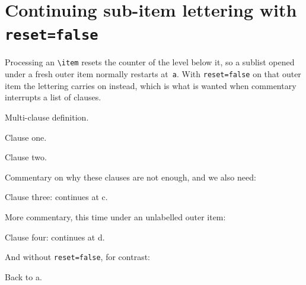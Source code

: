 \documentclass{article}
\begin{document}
\section{Continuing sub-item lettering with \texttt{reset=false}}

Processing an \verb|\item| resets the counter of the level below it, so a sublist
opened under a fresh outer item normally restarts at~\texttt{a}.  With
\texttt{reset=false} on that outer item the lettering carries on instead, which
is what is wanted when commentary interrupts a list of clauses.

\begin{prop}
  \item[style=P] Multi-clause definition. \label{mcd}
  \begin{prop}
    \item Clause one. \label{cl1}
    \item Clause two. \label{cl2}
  \end{prop}
\end{prop}

Commentary on why these clauses are not enough, and we also need:

\begin{prop}
  \item[reset=false]
  \begin{prop}
    \item Clause three: continues at c. \label{cl3}
  \end{prop}
\end{prop}

More commentary, this time under an unlabelled outer item:

\begin{prop}
  \item[counter=none, reset=false]
  \begin{prop}
    \item Clause four: continues at d. \label{cl4}
  \end{prop}
\end{prop}

And without \texttt{reset=false}, for contrast:

\begin{prop}
  \item[counter=none]
  \begin{prop}
    \item Back to a. \label{cl5}
  \end{prop}
\end{prop}
\end{document}
